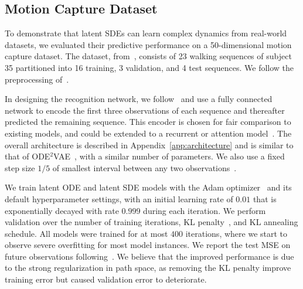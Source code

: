 \documentclass[twoside]{article}
\begin{document}
\newcommand{\rpm}{\raisebox{.2ex}{$\scriptstyle\pm$}}

\subsection{Motion Capture Dataset}
To demonstrate that latent SDEs can learn complex dynamics from real-world datasets, we evaluated their predictive performance on a 50-dimensional motion capture dataset.
The dataset, from~\citet{gan2015deep}, consists of 23 walking sequences of subject 35 partitioned into 16 training, 3 validation, and 4 test sequences. We follow the preprocessing of~\citet{wang2007gaussian}.

In designing the recognition network, we follow~\citet{yildiz2019ode} and use a fully connected network to encode the first three observations of each sequence and thereafter predicted the remaining sequence.
This encoder is chosen for fair comparison to existing models, and could be extended to a recurrent or attention model~\cite{vaswani2017attention}.
The overall architecture is described in Appendix~\ref{app:architecture} and is similar to that of ODE$^2$VAE~\cite{yildiz2019ode}, with a similar number of parameters. 
We also use a fixed step size $1/5$ of smallest interval between any two observations~\cite{yildiz2019ode}.

We train latent ODE and latent SDE models with the Adam optimizer~\cite{kingma2014adam} and its default hyperparameter settings, with an initial learning rate of $0.01$ that is exponentially decayed with rate $0.999$ during each iteration. 
We perform validation over the number of training iterations, KL penalty~\cite{higgins2017beta}, and KL annealing schedule. 
All models were trained for at most $400$ iterations, where we start to observe severe overfitting for most model instances. 
We report the test MSE on future observations following~\citet{yildiz2019ode}. 
We believe that the improved performance is due to the strong regularization in path space, as removing the KL penalty improve training error but caused validation error to deteriorate. 
\end{document}
